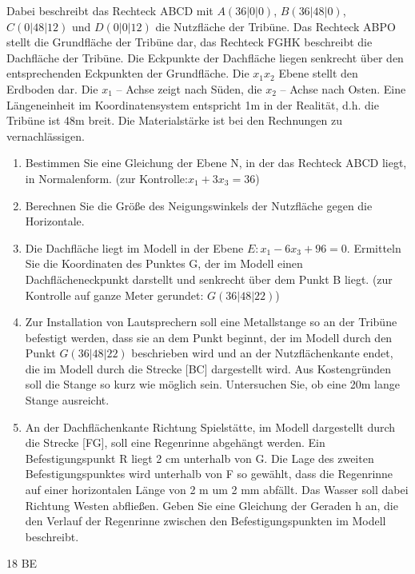 \documentclass[a4paper,12pt]{article}
\begin{document}
\enlargethispage{2cm}

Dabei beschreibt das Rechteck ABCD mit
  $A (36|0|0)$, $ B (36|48|0)$, $C (0|48|12)$ und $ D (0|0|12) $
die Nutzfläche der Tribüne. Das Rechteck ABPO stellt die Grundfläche der Tribüne dar, das
Rechteck FGHK beschreibt die Dachfläche der Tribüne. Die Eckpunkte der Dachfläche liegen
senkrecht über den entsprechenden Eckpunkten der Grundfläche.
Die $x_1x_2 $  Ebene stellt den Erdboden dar. Die $ x_1$ – Achse zeigt nach Süden, die $x_2$ – Achse nach
Osten. Eine Längeneinheit im Koordinatensystem entspricht 1m in der Realität, d.h. die Tribüne ist
48m breit. Die Materialstärke ist bei den Rechnungen zu vernachlässigen.
\begin{enumerate}[label={\alph*)}]
\item  Bestimmen Sie eine Gleichung der Ebene N, in der das Rechteck ABCD liegt, in
Normalenform. (zur Kontrolle:$ x_1 + 3x_3 = 36 $)
\item Berechnen Sie die Größe des Neigungswinkels der Nutzfläche gegen die Horizontale.
\item Die Dachfläche liegt im Modell in der Ebene $E: x_1 - 6x_3 + 96 = 0.$
Ermitteln Sie die Koordinaten des Punktes G, der im Modell einen Dachflächeneckpunkt
darstellt und senkrecht über dem Punkt B liegt. (zur Kontrolle auf ganze Meter gerundet: $G (36|48|22)$)
\item Zur Installation von Lautsprechern soll eine Metallstange so an der Tribüne befestigt
werden, dass sie an dem Punkt beginnt, der im Modell durch den Punkt $G (36|48|22)$  beschrieben wird
und an der Nutzflächenkante endet, die im Modell durch die Strecke [BC] dargestellt wird.
Aus Kostengründen soll die Stange so kurz wie möglich sein. Untersuchen Sie, ob eine 20m
lange Stange ausreicht.
\item An der Dachflächenkante Richtung Spielstätte, im Modell dargestellt durch die Strecke
[FG], soll eine Regenrinne abgehängt werden. Ein Befestigungspunkt R liegt 2 cm
unterhalb von G. Die Lage des zweiten Befestigungspunktes wird unterhalb von F so
gewählt, dass die Regenrinne auf einer horizontalen Länge von 2 m um 2 mm abfällt. Das
Wasser soll dabei Richtung Westen abfließen. Geben Sie eine Gleichung der Geraden h an,
die den Verlauf der Regenrinne zwischen den Befestigungspunkten im Modell beschreibt.
\end{enumerate}


\begin{flushright}18 BE \end{flushright}









\end{document}
